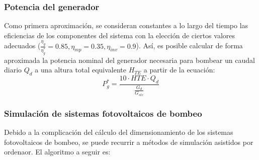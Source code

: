 \subsubsection{Potencia del generador}
\label{sec:org0947d87}
Como primera aproximación, se consideran constantes a lo largo del tiempo las eficiencias de los componentes del sistema con la elección de ciertos valores adecuados (\(\frac{\eta_g}{\eta_g^*}=0.85, \eta_{mp}=0.35, \eta_{inv}=0.9\)). Así, es posible calcular de forma aproximada la potencia nominal del generador necesaria para bombear un caudal diario \(Q_d\) a una altura total equivalente \(H_{TE}\) a partir de la ecuación:
\begin{equation}
P^*_g = \frac{10 \cdot HTE \cdot Q_d}{\frac{G_d}{G_{stc}}}
\end{equation}

\subsubsection{Simulación de sistemas fotovoltaicos de bombeo}
\label{sec:org1250d77}
Debido a la complicación del cálculo del dimensionamiento de los sistemas fotovoltaicos de bombeo, se puede recurrir a métodos de simulación asistidos por ordenaor. El algoritmo a seguir es:
